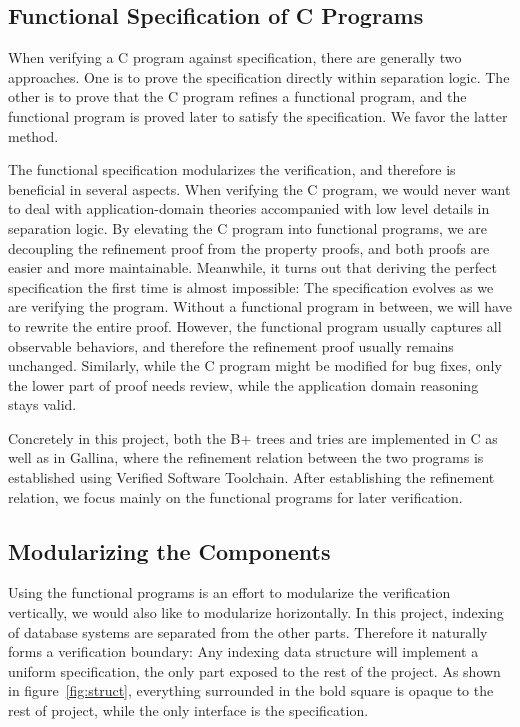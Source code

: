\documentclass[runningheads]{llncs}
\begin{document}
\subsection{Functional Specification of C Programs}

When verifying a C program against specification, there are generally two
approaches. One is to prove the specification directly within separation
logic. The other is to prove that the C program refines a functional program,
and the functional program is proved later to satisfy the specification. We
favor the latter method.

The functional specification modularizes the verification, and therefore
is beneficial in several aspects. When verifying the C program, we would never
want to deal with application-domain theories accompanied with low level
details in separation logic. By elevating the C program into functional
programs, we are decoupling the refinement proof from the property proofs, and
both proofs are easier and more maintainable. Meanwhile, it turns out that
deriving the perfect specification the first time is almost impossible: The
specification evolves as we are verifying the program. Without a functional
program in between, we will have to rewrite the entire proof. However, the
functional program usually captures all observable behaviors, and therefore the
refinement proof usually remains unchanged. Similarly, while the C program might
be modified for bug fixes, only the lower part of proof needs review, while the
application domain reasoning stays valid.

Concretely in this project, both the B+ trees and tries are implemented in C as
well as in Gallina, where the refinement relation between the two programs is
established using Verified Software Toolchain. After establishing the refinement
relation, we focus mainly on the functional programs for later verification.

\subsection{Modularizing the Components}

Using the functional programs is an effort to modularize the verification
vertically, we would also like to modularize horizontally. In this project,
indexing of database systems are separated from the other parts. Therefore it
naturally forms a verification boundary: Any indexing data structure will
implement a uniform specification, the only part exposed to the rest of the
project. As shown in figure~\ref{fig:struct}, everything surrounded in the bold
square is opaque to the rest of project, while the only interface is the
specification.
\end{document}
